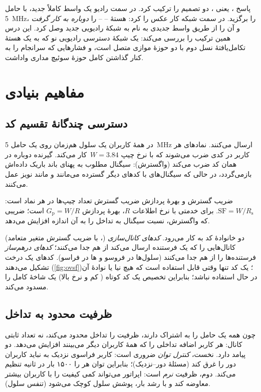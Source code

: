 \documentclass[11pt,a4paper]{article}
\begin{document}
پاسخ ، یعنی ، دو تصمیم را ترکیب کرد. در سمت رادیو یک واسط کاملاً جدید،
 با حامل \qty{5}{\mega\hertz}، را برگزید. در سمت شبکه کار عکس را کرد: هستهٔ
 --  -- را \emph{دوباره به کار گرفت} و آن را از طریق واسط
جدیدی به نام  به شبکهٔ رادیویی جدید وصل کرد. این درس همین ترکیب را بررسی می‌کند: یک
شبکهٔ دسترسی رادیویی نو که به یک هستهٔ تکامل‌یافتهٔ نسل دوم با دو حوزهٔ موازی متصل است، و
فشارهایی که سرانجام  را به کنار گذاشتن کامل حوزهٔ سوئیچ مداری واداشت.

\section{مفاهیم بنیادی}

\subsection{دسترسی چندگانهٔ تقسیم کد}
در  همهٔ کاربران یک سلول هم‌زمان روی یک حامل \qty{5}{\mega\hertz} ارسال می‌کنند.
نمادهای هر کاربر در کدی ضرب می‌شوند که با نرخ چیپ $W = 3.84$\, کار می‌کند. گیرنده
دوباره در همان کد ضرب می‌کند (واگسترش): سیگنال مطلوب به پهنای باند باریک داده‌اش بازمی‌گردد،
در حالی که سیگنال‌های با کدهای دیگر گسترده می‌مانند و مانند نویز عمل می‌کنند.

\begin{definitionbox}{ضریب گسترش و بهرهٔ پردازش}
ضریب گسترش تعداد چیپ‌ها در هر نماد است: $\mathrm{SF} = W/R_{\mathrm{s}}$. برای خدمتی با نرخ
اطلاعات $R$، بهرهٔ پردازش $G_{\mathrm{p}} = W/R$ است؛ ضریبی که واگسترش، نسبت سیگنال به تداخل
را به آن اندازه افزایش می‌دهد.
\end{definitionbox}

دو خانوادهٔ کد به کار می‌رود. \emph{کدهای کانال‌سازی} (، با ضریب گسترش متغیر متعامد)
کانال‌هایی را که یک فرستنده ارسال می‌کند از هم جدا می‌کنند؛ \emph{کدهای درهم‌ساز} فرستنده‌ها را
از هم جدا می‌کنند (سلول‌ها در فروسو و ها در فراسو). کدهای  یک درخت تشکیل
می‌دهند (\cref{fig:ovsf})؛ یک کد تنها وقتی قابل استفاده است که هیچ نیا یا نوادهٔ آن در حال استفاده
نباشد؛ بنابراین تخصیص یک کد کوتاه ( کم و نرخ بالا) یک شاخهٔ کامل را مسدود می‌کند.

\subsection{ظرفیت محدود به تداخل}
چون همه یک حامل را به اشتراک دارند، ظرفیت  را تداخل محدود می‌کند، نه تعداد ثابتی
کانال: هر کاربر اضافه تداخلی را که همهٔ کاربران دیگر می‌بینند افزایش می‌دهد. دو پیامد دارد.
نخست، \emph{کنترل توان} ضروری است: کاربر فراسوی نزدیک به  نباید کاربران دور را غرق کند
(مسئلهٔ دور--نزدیک)؛ بنابراین  توان هر  را ۱۵۰۰ بار در ثانیه تنظیم می‌کند.
دوم، ظرفیت \emph{نرم} است: اپراتور می‌تواند کمی کیفیت را با کاربران بیشتر معاوضه کند و با رشد
بار، پوشش سلول کوچک می‌شود (تنفس سلول).
\end{document}
